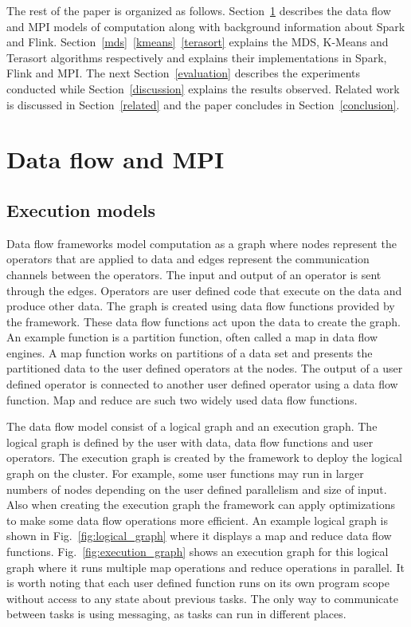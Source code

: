 \documentclass[conference]{IEEEtran}
\begin{document}
The rest of the paper is organized as follows. Section~\ref{data_flow_mpi} describes the data flow and MPI models of computation along with background information about Spark and Flink. Section~\ref{mds}~\ref{kmeans}~\ref{terasort} explains the MDS, K-Means and Terasort algorithms respectively and explains their implementations in Spark, Flink and MPI. The next Section~\ref{evaluation} describes the experiments conducted while Section~\ref{discussion} explains the results observed. Related work is discussed in Section~\ref{related} and the paper concludes in Section~\ref{conclusion}.

\section{Data flow and MPI} \label{data_flow_mpi}

\subsection{Execution models}

Data flow frameworks model computation as a graph where nodes represent the operators that are applied to data and edges represent the communication channels between the operators. The input and output of an operator is sent through the edges. Operators are user defined code that execute on the data and produce other data. The graph is created using data flow functions provided by the framework. These data flow functions act upon the data to create the graph. An example function is a partition function, often called a map in data flow engines. A map function works on partitions of a data set and presents the partitioned data to the user defined operators at the nodes. The output of a user defined operator is connected to another user defined operator using a data flow function. Map and reduce are such two widely used data flow functions. 

The data flow model consist of a logical graph and an execution graph. The logical graph is defined by the user with data, data flow functions and user operators. The execution graph is created by the framework to deploy the logical graph on the cluster. For example, some user functions may run in larger numbers of nodes depending on the user defined parallelism and size of input. Also when creating the execution graph the framework can apply optimizations to make some data flow operations more efficient. An example logical graph is shown in Fig.~\ref{fig:logical_graph} where it displays a map and reduce data flow functions. Fig.~\ref{fig:execution_graph} shows an execution graph for this logical graph where it runs multiple map operations and reduce operations in parallel. It is worth noting that each user defined function runs on its own program scope without access to any state about previous tasks. The only way to communicate between tasks is using messaging, as tasks can run in different places.
\end{document}
